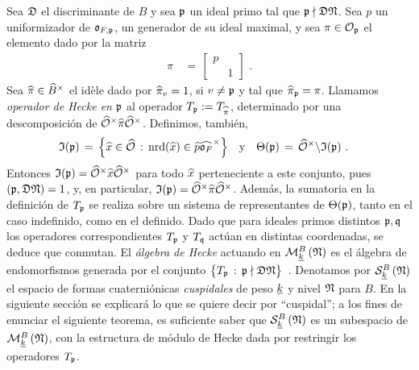 Sea $\frak{D}$ el discriminante de $B$ y sea $\frak{p}$ un ideal primo tal que
$\frak{p}\nmid\frak{D}\frak{N}$. Sea $p$ un uniformizador de
$\oka{F,\frak{p}}$, un generador de su ideal maximal, y sea
$\pi\in\cal{O}_{\frak{p}}$ el elemento dado por la matriz
\begin{align*}
	\pi & \,=\,\begin{bmatrix} p & \\ & 1 \end{bmatrix}
	\text{ .}
\end{align*}
%
Sea $\hhat{\pi}\in\Idfin{B}$ el id\`{e}le dado por $\hhat{\pi}_{v}=1$, si
$v\not=\frak{p}$ y tal que $\hhat{\pi}_{\frak{p}}=\pi$. Llamamos
\emph{operador de Hecke en $\frak{p}$} al operador
$T_{\frak{p}}:=T_{\hhat{\pi}}$, determinado por una descomposici\'{o}n de
$\Idfin{\cal{O}}\hhat{\pi}\Idfin{\cal{O}}$. Definimos, tambi\'{e}n,
\begin{align*}
	\frak{I}(\frak{p}) \,=\,\Big\{\hhat{x}\in\Adfin{\cal{O}}\,:\,
		\nrd(\hhat{x})\in\hhat{p}\Idfin{\oka{F}}\Big\}
		& \quad\text{y} \quad
	\Theta(\frak{p})\,=\,\Idfin{\cal{O}}\backslash\frak{I}(\frak{p})
	\text{ .}
\end{align*}
%
Entonces $\frak{I}(\frak{p})=\Idfin{\cal{O}}\hhat{x}\Idfin{\cal{O}}$ para todo
$\hhat{x}$ perteneciente a este conjunto, pues $(\frak{p},\frak{D}\frak{N})=1$,
y, en particular,
$\frak{I}(\frak{p})=\Idfin{\cal{O}}\hhat{\pi}\Idfin{\cal{O}}$. Adem\'{a}s, la
sumatoria en la definici\'{o}n de $T_{\frak{p}}$ se realiza sobre un sistema de
representantes de $\Theta(\frak{p})$, tanto en el caso indefinido, como en el
definido. Dado que para ideales primos distintos $\frak{p},\frak{q}$ los
operadores correspondientes $T_{\frak{p}}$ y $T_{\frak{q}}$ act\'{u}an en
distintas coordenadas, se deduce que conmutan. El \emph{\'{a}lgebra de Hecke}
actuando en $\modularH[B]{k}{\frak{N}}$ es el \'{a}lgebra de endomorfismos
generada por el conjunto
\begin{math}
	\big\{T_{\frak{p}}\,:\,\frak{p}\nmid\frak{D}\frak{N}\big\}
\end{math}~.
Denotamos por $\spitzH[B]{k}{\frak{N}}$ el espacio de formas cuaterni\'{o}nicas
\emph{cuspidales} de peso $\peso{k}$ y nivel $\frak{N}$ para $B$. En la
siguiente secci\'{o}n se explicar\'{a} lo que se quiere decir por ``cuspidal'';
a los fines de enunciar el siguiente teorema, es suficiente saber que
$\spitzH[B]{k}{\frak{N}}$ es un subespacio de $\modularH[B]{k}{\frak{N}}$, con
la estructura de m\'{o}dulo de Hecke dada por restringir los operadores
$T_{\frak{p}}$.

